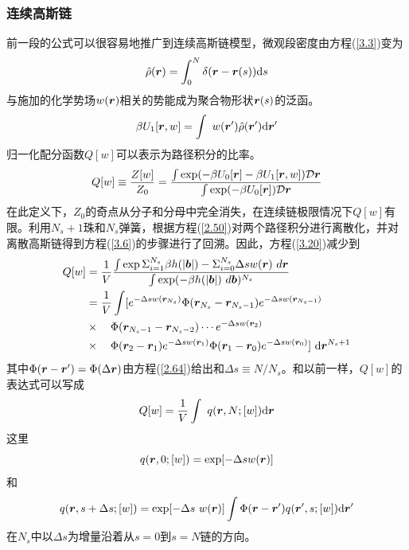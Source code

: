 \subsubsection{连续高斯链}
前一段的公式可以很容易地推广到连续高斯链模型，微观段密度由方程(\ref{3.3})变为
\begin{equation}\label{3.18}
\hat{\rho}(\bm{r})=\int_0^N\delta(\bm{r}-\bm{r}(s))\mathrm{d}s
\end{equation}
与施加的化学势场$w(\bm{r})$相关的势能成为聚合物形状$\bm{r}(s)$的泛函。
\begin{equation}\label{3.19}
\beta U_1[\bm{r},w]=\int~w(\bm{r}')\hat{\rho}(\bm{r}')\mathrm{d}\bm{r}'
\end{equation}
归一化配分函数$Q[w]$可以表示为路径积分的比率。
\begin{equation}\label{3.20}
Q[w]\equiv\frac{Z[w]}{Z_0}=\frac{\int\exp(-\beta U_0[\bm{r}]-\beta U_1[\bm{r},w])\mathcal{D}\bm{r}}{\int\exp(-\beta U_0[\bm{r}])\mathcal{D}\bm{r}}
\end{equation}
在此定义下，$Z_0$的奇点从分子和分母中完全消失，在连续链极限情况下$Q[w]$有限。利用$N_s+1$珠和$N_s$弹簧，根据方程(\ref{2.50})对两个路径积分进行离散化，并对离散高斯链得到方程(\ref{3.6})的步骤进行了回溯。因此，方程(\ref{3.20})减少到
\begin{equation}\label{3.21}
\begin{aligned}
Q[w]&=\frac{1}{V} \frac{ \int \exp \Sigma_{i=1}^{N_{s}} \beta h(|\bm{b}|) - \Sigma_{i=0}^{N_{s}} \Delta s w(\bm{r}) ~d\bm{r} }{\int \exp (-\beta h(|\bm{b}|)~d\bm{b})^{N_{s}}}\\
&=\frac{1}{V}\int[e^{-\Delta sw(\bm{r}_{N_s})}\Phi(\bm{r}_{N_s}-\bm{r}_{N_s-1})e^{-\Delta sw(\bm{r}_{N_s-1})}\\
&\times\quad\Phi(\bm{r}_{N_s-1}-\bm{r}_{N_s-2})\cdots e^{-\Delta sw(\bm{r}_2)}\\
&\times\quad\Phi(\bm{r}_2-\bm{r}_1)e^{-\Delta sw(\bm{r}_1)}\Phi(\bm{r}_1-\bm{r}_0)e^{-\Delta sw(\bm{r}_0)}]~\mathrm{d}\bm{r}^{N_s+1}
\end{aligned}
\end{equation}
其中$\Phi(\bm{r}-\bm{r}')=\Phi(\Delta\bm{r})$由方程(\ref{2.64})给出和$\Delta s\equiv N/N_s$。和以前一样，$Q[w]$的表达式可以写成
\begin{equation}\label{3.22}
Q[w]=\frac{1}{V}\int~q(\bm{r},N;[w])\mathrm{d}\bm{r}
\end{equation}
这里
\begin{equation}\label{3.23}
q(\bm{r},0;[w])=\exp[-\Delta sw(\bm{r})]
\end{equation}
和
\begin{equation}\label{3.24}
q(\bm{r},s+\Delta s;[w])=\exp[-\Delta s~w(\bm{r})]\int\Phi(\bm{r}-\bm{r}')q(\bm{r}',s;[w])\mathrm{d}\bm{r}'
\end{equation}
在$N_s$中以$\Delta s$为增量沿着从$s=0$到$s=N$链的方向。

